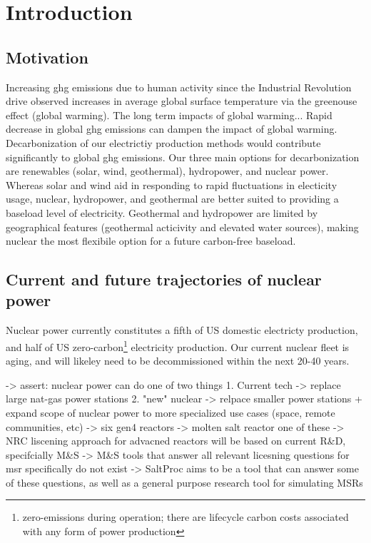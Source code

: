 \chapter{Introduction}%
\label{cha:introduction}

\section{Motivation}%
\label{sec:motivation}

Increasing \Gls{ghg} emissions due to human activity since the Industrial Revolution drive observed increases in average global surface temperature via the greenouse effect\cite{mitchell_greenhouse_1989} \cite{paola_a_arias_2021_ts}(global warming).
The long term impacts of global warming...
Rapid decrease in global \Gls{ghg} emissions can dampen the impact of global warming. Decarbonization of our electrictiy production methods would contribute significantly to global \Gls{ghg} emissions. Our three main options for decarbonization are renewables (solar, wind, geothermal), hydropower, and nuclear power. Whereas solar and wind aid in responding to rapid fluctuations in electicity usage, nuclear, hydropower, and geothermal are better suited to
providing a baseload level of electricity. Geothermal and hydropower are limited by geographical features (geothermal acticivity and elevated water sources), making nuclear the most flexibile option for a future carbon-free baseload.

\section{Current and future trajectories of nuclear power}%
\label{sec:current_and_future_trajectories_of_nuclear_power}
Nuclear power currently constitutes a fifth of US domestic electricty production, and half of US zero-carbon\footnote{zero-emissions during operation; there are lifecycle carbon costs associated with any form of power production} electricity production. Our current nuclear fleet is aging, and will likeley need to be decommissioned within the next 20-40 years.


 -> assert: nuclear power can do one of two things
    1. Current tech -> replace large nat-gas power stations 
    2. "new" nuclear -> relpace smaller power stations + expand scope
        of nuclear power to more specialized use cases (space, remote communities, etc)
-> six gen4 reactors -> molten salt reactor one of these
-> NRC liscening approach for advacned reactors will be based on current R\&D, specifcially M\&S
-> M\&S tools that answer all relevant licesning questions for msr specifically do not exist
-> SaltProc aims to be a tool that can answer some of these questions, as well as a general purpose
    research tool for simulating MSRs

